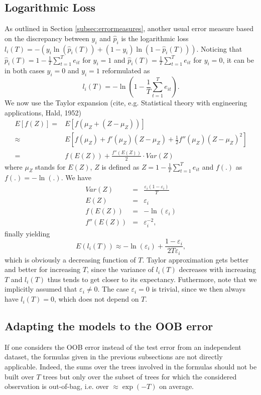 \documentclass[paper=a4
               ,12pt
               ,DIV=12
               ,parskip=half
               ,titlepage=on
               ,headinclude 
               ,footinclude
               ,headsepline
               ,footsepline         %
               ,ilines 
               ]{scrartcl}
\begin{document}
\subsection{Logarithmic Loss}
As outlined in Section \ref{subsec:errormeasures}, another usual error measure based on the discrepancy between $y_i$ and $\hat{p}_i$ is the logarithmic loss $l_i(T)=-(y_i\ln (\hat{p}_i(T))+(1-y_i)\ln (1-\hat{p}_i(T)))$. 
Noticing that $\hat{p}_i(T)=1-\frac{1}{T}\sum_{t=1}^Te_{it}$ for $y_i=1$ and $\hat{p}_i(T)=\frac{1}{T}\sum_{t=1}^Te_{it}$ for $y_i=0$, it can be in both cases $y_i=0$ and $y_i=1$ reformulated as
\[
l_i(T) =  -\ln \left( 1-\frac{1}{T}\sum_{t=1}^T e_{it} \right).
\]
We now use the Taylor expansion  (cite, e.g. Statistical theory with engineering applications, Hald, 1952)
\begin{align}
E\left[f(Z)\right]  {} = & E\left[f(\mu_Z + \left(Z - \mu_Z\right))\right] \nonumber \\
\approx & E \left[f(\mu_Z) + f'(\mu_Z)\left(Z-\mu_Z\right) + \frac{1}{2}f''(\mu_Z) \left(Z - \mu_Z\right)^2 \right] \nonumber \\
 = & f(E(Z)) + \frac{f''(E(Z))}{2} \cdot Var(Z) \nonumber
\end{align}
where $\mu_Z$ stands for $E(Z)$, $Z$ is defined as $Z=1-\frac{1}{T}\sum_{t=1}^T e_{it}$ and $f(.)$ as $f(.)=-\ln (.)$.
We have
\begin{eqnarray}
Var(Z) & = & \frac{\varepsilon_i(1-\varepsilon_i)}{T}\\
E(Z) & = & \varepsilon_i \\
f(E(Z)) & = & -\ln(\varepsilon_i) \\
f''(E(Z)) & = & \varepsilon_i^{-2},
\end{eqnarray}
finally yielding
\[
E(l_i(T)) \approx  -\ln (\varepsilon_i)+\frac{1-\varepsilon_i}{2T\varepsilon_i},
\]
which is obviously a decreasing function of $T$. Taylor approximation gets better and better for increasing $T$, since the variance of $l_i(T)$ decreases with increasing $T$ and $l_i(T)$ thus tends to get closer to its expectancy. Futhermore, note that we implicitly assumed that $\varepsilon_i\neq 0$. The case $\varepsilon_i=0$ is trivial, since we then always have $l_i(T)=0$, which does not depend on $T$.

\subsection{Adapting the models to the OOB error}

If one considers the OOB error instead of the test error from an independent dataset, the formulas given in the previous subsections are not directly applicable.
Indeed, the sums over the trees involved in the formulas should not be built over $T$ trees but only over the subset of trees for which the considered observation is out-of-bag, i.e. over $\approx\exp (-T)$ on average.
\end{document}
